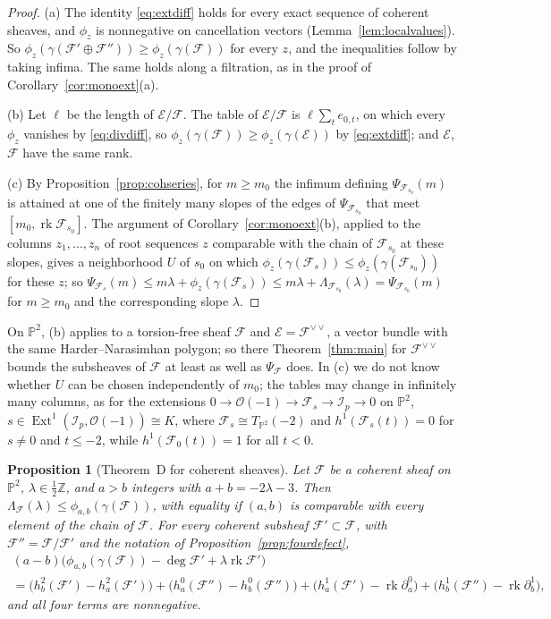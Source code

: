 \documentclass[11pt]{amsart}
\newtheorem{proposition}[theorem]{Proposition}
\theoremstyle{definition}
\theoremstyle{remark}
\newcommand{\PP}{\mathbb{P}}
\newcommand{\ZZ}{\mathbb{Z}}
\newcommand{\OO}{\mathcal{O}}
\newcommand{\cE}{\mathcal{E}}
\newcommand{\cF}{\mathcal{F}}
\newcommand{\cI}{\mathcal{I}}
\DeclareMathOperator{\rk}{rk}
\DeclareMathOperator{\Ext}{Ext}
\begin{document}
\begin{proof}
(a) The identity \eqref{eq:extdiff} holds for every exact sequence of coherent sheaves, and $\phi_z$ is nonnegative on cancellation vectors (Lemma~\ref{lem:localvalues}). So $\phi_z(\gamma(\cF'\oplus\cF''))\ge\phi_z(\gamma(\cF))$ for every $z$, and the inequalities follow by taking infima. The same holds along a filtration, as in the proof of Corollary~\ref{cor:monoext}(a).

(b) Let $\ell$ be the length of $\cE/\cF$. The table of $\cE/\cF$ is $\ell\sum_te_{0,t}$, on which every $\phi_z$ vanishes by \eqref{eq:divdiff}, so $\phi_z(\gamma(\cF))\ge\phi_z(\gamma(\cE))$ by \eqref{eq:extdiff}; and $\cE$, $\cF$ have the same rank.

(c) By Proposition~\ref{prop:cohseries}, for $m\ge m_0$ the infimum defining $\Psi_{\cF_{s_0}}(m)$ is attained at one of the finitely many slopes of the edges of $\Psi_{\cF_{s_0}}$ that meet $[m_0,\rk\cF_{s_0}]$. The argument of Corollary~\ref{cor:monoext}(b), applied to the columns $z_1,\dots,z_n$ of root sequences $z$ comparable with the chain of $\cF_{s_0}$ at these slopes, gives a neighborhood $U$ of $s_0$ on which $\phi_z(\gamma(\cF_s))\le\phi_z(\gamma(\cF_{s_0}))$ for these $z$; so $\Psi_{\cF_s}(m)\le m\lambda+\phi_z(\gamma(\cF_s))\le m\lambda+\Lambda_{\cF_{s_0}}(\lambda)=\Psi_{\cF_{s_0}}(m)$ for $m\ge m_0$ and the corresponding slope $\lambda$.
\end{proof}

On $\PP^2$, (b) applies to a torsion-free sheaf $\cF$ and $\cE=\cF^{\vee\vee}$, a vector bundle with the same Harder--Narasimhan polygon; so there Theorem~\ref{thm:main} for $\cF^{\vee\vee}$ bounds the subsheaves of $\cF$ at least as well as $\Psi_\cF$ does. In (c) we do not know whether $U$ can be chosen independently of $m_0$; the tables may change in infinitely many columns, as for the extensions $0\to\OO(-1)\to\cF_s\to\cI_p\to0$ on $\PP^2$, $s\in\Ext^1(\cI_p,\OO(-1))\cong K$, where $\cF_s\cong T_{\PP^2}(-2)$ and $h^1(\cF_s(t))=0$ for $s\ne0$ and $t\le-2$, while $h^1(\cF_0(t))=1$ for all $t<0$.

\begin{proposition}[Theorem~D for coherent sheaves]\label{prop:cohD}
Let $\cF$ be a coherent sheaf on $\PP^2$, $\lambda\in\frac12\ZZ$, and $a>b$ integers with $a+b=-2\lambda-3$. Then $\Lambda_\cF(\lambda)\le\phi_{a,b}(\gamma(\cF))$, with equality if $(a,b)$ is comparable with every element of the chain of $\cF$. For every coherent subsheaf $\cF'\subset\cF$, with $\cF''=\cF/\cF'$ and the notation of Proposition~\ref{prop:fourdefect},
\begin{multline*}
(a-b)\big(\phi_{a,b}(\gamma(\cF))-\deg\cF'+\lambda\rk\cF'\big)\\=\big(h^2_b(\cF')-h^2_a(\cF')\big)+\big(h^0_a(\cF'')-h^0_b(\cF'')\big)+\big(h^1_a(\cF')-\rk\partial^0_a\big)+\big(h^1_b(\cF'')-\rk\partial^1_b\big),
\end{multline*}
and all four terms are nonnegative.
\end{proposition}
\end{document}
